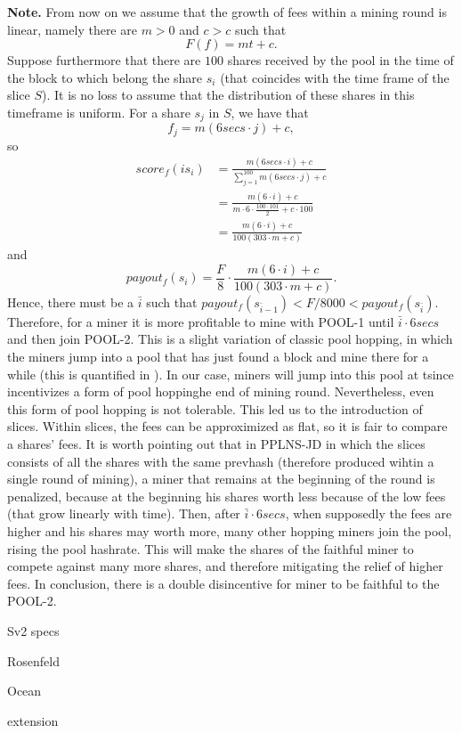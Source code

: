 \documentclass[11pt]{article} %
\begin{document}
\textbf{Note.} From now on we assume that the growth of fees within a mining round is linear, namely there are $m>0$ and $c>c$ such that 
\[F(f) = mt+c.\]
Suppose furthermore that there are $100$ shares received by the pool in the time of the block to which belong the share $s_i$ (that coincides with the time frame of the slice $S$). It is no loss to assume that the distribution of these shares in this timeframe is uniform. For a share $s_j$ in $S$, we have that 
\[ f_j = m(6secs \cdot j) +c,\]
so
\begin{align*}
	score_f(is_i) &= \frac{m(6secs\cdot i) +c}{\sum_{j=1}^{100} m(6secs\cdot j) +c}\\
	&= \frac{m(6\cdot i) +c}{m\cdot 6\cdot\frac{100\cdot101}{2} +c\cdot 100}\\
	&= \frac{m(6\cdot i) +c}{100(303\cdot m +c)}
\end{align*}
and 
\[payout_f(s_i) = \frac{F}{8} \cdot \frac{m(6\cdot i) +c}{100(303\cdot m +c)}.\]
Hence, there must be a $\bar i$ such that $payout_f(s_{\bar i -1})< F/8000<payout_f(s_{\bar i })$.
Therefore, for a miner it is more profitable to mine with POOL-1 until $\bar i \cdot 6 secs$ and then join POOL-2. This is a slight variation of classic pool hopping, in which the miners jump into a pool that has just found a block and mine there for a while (this is quantified in \cite{rosenfeld}). In our case, miners will jump into this pool at tsince incentivizes a form of pool hoppinghe end of mining round. Nevertheless, even this form of pool hopping is not tolerable. This led us to the introduction of slices. Within slices, the fees can be approximized as flat, so it is fair to compare a shares' fees.
It is worth pointing out that in PPLNS-JD in which the slices consists of all the shares with the same prevhash (therefore produced wihtin a single round of mining), a miner that remains at the beginning of the round is penalized, because at the beginning his shares worth less because of the low fees (that grow linearly with time). Then, after $\bar i \cdot 6 secs$, when supposedly the fees are higher and his shares may worth more, many other hopping miners join the pool, rising the pool hashrate. This will make the shares of the faithful miner to compete against many more shares, and therefore mitigating the relief of higher fees. In conclusion, there is a double disincentive for miner to be faithful to the POOL-2.

\begin{thebibliography}{9}

Sv2 specs

Rosenfeld

Ocean

 extension

\end{thebibliography}
\end{document}
